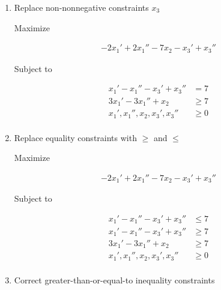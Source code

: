 \documentclass[12pt]{article}
\begin{document}
\begin{enumerate}[1.]
\begin{enumerate}[1.]
\begin{mdframed}
        \end{mdframed}

        \item Replace non-nonnegative constraints $x_3$

        \begin{mdframed}

        Maximize

        \begin{align*}
            -2x_1' + 2x_1'' - 7x_2 - x_3' + x_3''
        \end{align*}

        Subject to

        \begin{align*}
            x_1' - x_1'' - x_3' + x_3''  &= 7\\
            3x_1' - 3x_1'' + x_2 &\geq 7\\
            x_1', x_1'', x_2, x_3', x_3'' &\geq 0\\
        \end{align*}

        \end{mdframed}

        \item Replace equality constraints with $\geq$ and $\leq$

        \begin{mdframed}

        Maximize

        \begin{align*}
            -2x_1' + 2x_1'' - 7x_2 - x_3' + x_3''
        \end{align*}

        Subject to

        \begin{align*}
            x_1' - x_1'' - x_3' + x_3''  &\leq 7\\
            x_1' - x_1'' - x_3' + x_3''  &\geq 7\\
            3x_1' - 3x_1'' + x_2 &\geq 7\\
            x_1', x_1'', x_2, x_3', x_3'' &\geq 0\\
        \end{align*}

        \end{mdframed}

        \item Correct greater-than-or-equal-to inequality constraints

        \begin{mdframed}


\end{mdframed}
\end{enumerate}
\end{enumerate}
\end{document}
